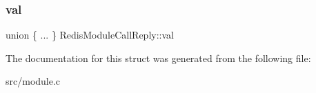 \mbox{\label{structRedisModuleCallReply_a3cc8a4a45fb13797ad9173e231c649d3}} 
\subsubsection{\texorpdfstring{val}{val}}
{\footnotesize\ttfamily union \{ ... \}   Redis\+Module\+Call\+Reply\+::val}



The documentation for this struct was generated from the following file\+:\begin{DoxyCompactItemize}
\item 
src/module.\+c\end{DoxyCompactItemize}
